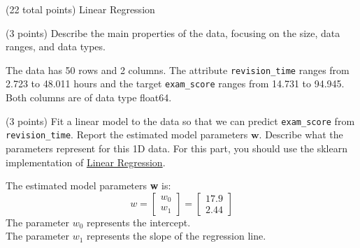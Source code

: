 \documentclass[12pt]{article}
\begin{document}
\maketitle
\thispagestyle{empty}







\clearpage

\begin{question}{(22 total points) Linear Regression}




%
%
\begin{subquestion}{(3 points) Describe the main properties of the data, focusing on the size, data ranges, and data types.   
}


\begin{answerbox}{10em}
The data has 50 rows and 2 columns. The attribute  \texttt{revision\_time} ranges from 2.723 to 48.011 hours and the target \texttt{exam\_score} ranges from 14.731 to 94.945. Both columns are of data type float64.
\end{answerbox}



\end{subquestion}




%
%
\begin{subquestion}{(3 points) Fit a linear model to the data so that we can predict \texttt{exam\_score} from \texttt{revision\_time}. 
Report the estimated model parameters $\mathbf{w}$. 
Describe what the parameters represent for this 1D data. 
For this part, you should use the sklearn implementation of \href{https://scikit-learn.org/0.19/modules/generated/sklearn.linear_model.LinearRegression.html}{Linear Regression}.\\
}


\begin{answerbox}{10em}
The estimated model parameters \textbf{w}  is:\\
\[
w=
\begin{bmatrix}
    w_0      \\
    w_1      
\end{bmatrix}
= 
\begin{bmatrix}
    17.9      \\
    2.44 
\end{bmatrix} 
\]
The parameter $w_0$ represents the intercept. \\
The parameter $w_1$ represents the slope of the regression line.
\end{answerbox}




\end{subquestion}
\end{question}
\end{document}
